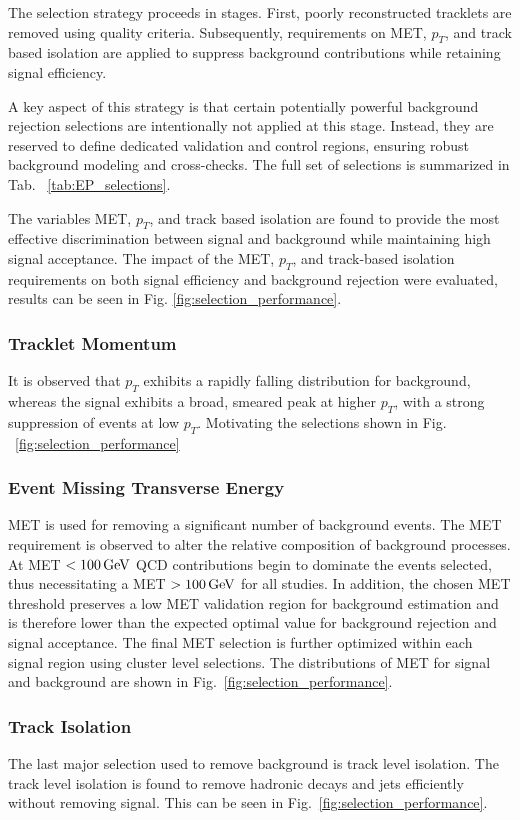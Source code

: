 The selection strategy proceeds in stages. First, poorly reconstructed tracklets are removed using quality criteria. Subsequently, requirements on MET, $p_T$, and track based isolation are applied to suppress background contributions while retaining signal efficiency. 

A key aspect of this strategy is that certain potentially powerful background rejection selections are intentionally not applied at this stage. Instead, they are reserved to define dedicated validation and control regions, ensuring robust background modeling and cross-checks. The full set of selections is summarized in Tab. ~\ref{tab:EP_selections}.

The variables MET, $p_T$, and track based isolation are found to provide the most effective discrimination between signal and background while maintaining high signal acceptance.
The impact of the MET, $p_T$, and track-based isolation requirements on both signal efficiency and background rejection were evaluated, results can be seen in Fig. \ref{fig:selection_performance}.

\subsubsection{Tracklet Momentum}
It is observed that $p_T$ exhibits a rapidly falling distribution for background, whereas the signal exhibits a broad, smeared peak at higher $p_T$, with a strong suppression of events at low $p_T$. Motivating the selections shown in Fig. ~\ref{fig:selection_performance}

\subsubsection{Event Missing Transverse Energy}
MET is used for removing a significant number of background events. The MET requirement is observed to alter the relative composition of background processes. At MET $< 100\,\text{GeV}$ QCD contributions begin to dominate the events selected, thus necessitating a MET $> 100\,\text{GeV}$ for all studies. In addition, the chosen MET threshold preserves a low MET validation region for background estimation and is therefore lower than the expected optimal value for background rejection and signal acceptance. The final MET selection is further optimized within each signal region using cluster level selections. The distributions of MET for signal and background are shown in Fig.~\ref{fig:selection_performance}.

\subsubsection{Track Isolation}
The last major selection used to remove background is track level isolation. The track level isolation is found to remove hadronic decays and jets efficiently without removing signal. This can be seen in Fig.~\ref{fig:selection_performance}.


